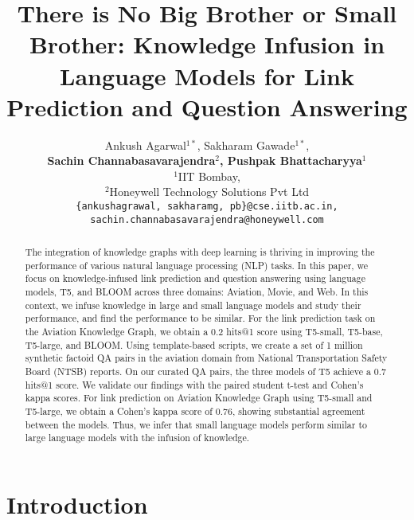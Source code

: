 \documentclass[11pt]{article}
\title{There is No Big Brother or Small Brother: Knowledge Infusion in Language Models for Link Prediction and Question Answering}
\author{Ankush Agarwal$^{1*}$, Sakharam Gawade$^{1*}$, \\\textbf{Sachin Channabasavarajendra$^2$, Pushpak Bhattacharyya$^1$}\\
        $^1$IIT Bombay, \\$^2$Honeywell Technology Solutions Pvt Ltd \\
        \texttt{\{ankushagrawal, sakharamg, pb\}@cse.iitb.ac.in,}\\
         \texttt{sachin.channabasavarajendra@honeywell.com}}
\begin{document}
\maketitle
\def\thefootnote{*}\def\thefootnote{\arabic{footnote}}

\begin{abstract}

The integration of knowledge graphs with deep learning is thriving in improving the performance of various natural language processing (NLP) tasks. In this paper, we focus on knowledge-infused link prediction and question answering using language models, T5, and BLOOM across three domains: Aviation, Movie, and Web. 
In this context, we infuse knowledge in large and small language models and study their performance, and find the performance to be similar. For the link prediction task on the Aviation Knowledge Graph, we obtain a 0.2 hits@1 score using T5-small, T5-base, T5-large, and BLOOM. Using template-based scripts, we create a set of 1 million synthetic factoid QA pairs in the aviation domain from National Transportation Safety Board (NTSB) reports. On our curated QA pairs, the three models of T5 achieve a 0.7 hits@1 score. 
We validate our findings with the paired student t-test and Cohen's kappa scores. 
For link prediction on Aviation Knowledge Graph using T5-small and T5-large, we obtain a Cohen's kappa score of 0.76, showing substantial agreement between the models. Thus, we infer that small language models perform similar to large language models with the infusion of knowledge.
\end{abstract}


\section{Introduction} \label{intro}
\end{document}
